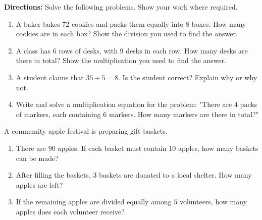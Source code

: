 \documentclass[12pt]{article}
\begin{document}
\vspace{1em}

\begin{tcolorbox}[colframe=black!60, colback=white, 
coltitle=black, colbacktitle=black!15, fonttitle=\bfseries\Large, 
title=Problems, halign title=center, left=10pt, right=10pt, top=10pt, bottom=60pt]
\textbf{Directions:} Solve the following problems. Show your work where required.

\begin{enumerate}[start=17, itemsep=8em]
    \item A baker bakes 72 cookies and packs them equally into 8 boxes. How many cookies are in each box? Show the division you used to find the answer.
    \item A class has 6 rows of desks, with 9 desks in each row. How many desks are there in total? Show the multiplication you used to find the answer.
    \item A student claims that \(35 \div 5 = 8\). Is the student correct? Explain why or why not.
  
    \item Write and solve a multiplication equation for the problem: "There are 4 packs of markers, each containing 6 markers. How many markers are there in total?"

    \vspace{5em}
\end{enumerate}
\end{tcolorbox}

\vspace{1em}
\newpage
\begin{tcolorbox}[colframe=black!60, colback=white, 
coltitle=black, colbacktitle=black!15, fonttitle=\bfseries\Large, 
title=Performance Task: Organizing an Apple Festival, halign title=center, left=10pt, right=10pt, top=10pt, bottom=50pt]
A community apple festival is preparing gift baskets.

\begin{enumerate}[itemsep=5em]
    \item There are \(90\) apples. If each basket must contain \(10\) apples, how many baskets can be made?
    \item After filling the baskets, \(3\) baskets are donated to a local shelter. How many apples are left?
    \item If the remaining apples are divided equally among \(5\) volunteers, how many apples does each volunteer receive?
 
\end{enumerate}
\vspace{3em}
\end{tcolorbox}
\end{document}
